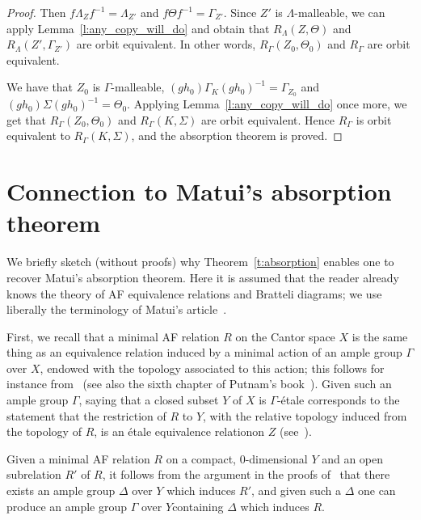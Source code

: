 \documentclass[AHL,Unicode]{cedram}
\newcommand*{\MK}{\mkern 2mu}
\begin{document}
\begin{proof}
Then $f \Lambda_Z f^{-1} = \Lambda_{Z'}$ and $f \Theta f^{-1}= \Gamma_{Z'}$. Since $Z'$ is $\Lambda$-malleable, we can apply Lemma~\ref{l:any_copy_will_do} and obtain that $R_\Lambda(Z,\Theta)$ and $R_\Lambda(Z',\Gamma_{Z'})$ are orbit equivalent. In other words, $R_\Gamma(Z_0,\Theta_0)$ and $R_\Gamma$ are orbit equivalent.

We have that $Z_0$ is $\Gamma$-malleable, $(gh_0) \Gamma_K (gh_0)^{-1}=\Gamma_{Z_0}$ and $(gh_0) \Sigma (gh_0)^{-1}= \Theta_0$. Applying Lemma~\ref{l:any_copy_will_do} once more, we get that $R_\Gamma(Z_0,\Theta_0)$ and $R_\Gamma(K,\Sigma)$ are orbit equivalent. Hence $R_\Gamma$ is orbit equivalent to $R_\Gamma(K,\Sigma)$, and the absorption theorem is proved.
\end{proof}

\section{Connection to Matui's absorption theorem}

We briefly sketch (without proofs) why Theorem~\ref{t:absorption} enables one to recover Matui's absorption theorem. Here it is assumed that the reader already knows the theory of AF equivalence relations and Bratteli diagrams; we use liberally the terminology of Matui's article~\cite{Matui2008}.

First, we recall that a minimal AF relation $R$ on the Cantor space $X$ is the same thing as an equivalence relation induced by a minimal action of an ample group $\Gamma$ over $X$, endowed with the topology associated to this action; this follows for instance from~\cite[Theorem~3.9]{Giordano2004} (see also the sixth chapter of Putnam's book~\cite{Putnam2018}). Given such an ample group $\Gamma$, saying that a closed subset $Y$ of $X$ is $\Gamma$-étale corresponds to the statement that the restriction of $R$ to $Y$, with the relative topology induced from the topology of $R$, is an étale equivalence relation\linebreak on $Z$ (see~\cite[Theorem~3.11]{Giordano2004}).

Given a minimal AF relation $R$ on a compact, $0$-dimensional $Y$ and an open subrelation $R'$ of $R$, it follows from the argument in the proofs of~\cite[Proposition~3.12$\MK$(ii) and Theorem~3.9]{Giordano2004} that there exists an ample group $\Delta$ over $Y$ which induces $R'$, and given such a $\Delta$ one can produce an ample group $\Gamma$ over $Y$containing $\Delta$ which induces $R$.
\end{document}
